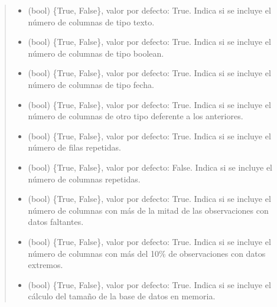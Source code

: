 \documentclass[letterpaper,10pt,openany,spanish]{sphinxmanual}
\begin{document}
\begin{fulllineitems}
\begin{fulllineitems}
\begin{quote}
\begin{description}
\begin{itemize}
\item {} 
 \textendash{} (bool) \{True, False\}, valor por defecto: True.             Indica si se incluye el número de columnas de tipo texto.

\item {} 
 \textendash{} (bool) \{True, False\}, valor por defecto: True.             Indica si se incluye el número de columnas de tipo boolean.

\item {} 
 \textendash{} (bool) \{True, False\}, valor por defecto: True.             Indica si se incluye el número de columnas de tipo fecha.

\item {} 
 \textendash{} (bool) \{True, False\}, valor por defecto: True.             Indica si se incluye el número de columnas de otro tipo deferente             a los anteriores.

\item {} 
 \textendash{} (bool) \{True, False\}, valor por defecto: True.             Indica si se incluye el número de filas repetidas.

\item {} 
 \textendash{} (bool) \{True, False\}, valor por defecto:             False. Indica si se incluye el número de columnas repetidas.

\item {} 
 \textendash{} (bool) \{True, False\}, valor por defecto: True.             Indica si se incluye el número de columnas con más de la mitad de             las observaciones con datos faltantes.

\item {} 
 \textendash{} (bool) \{True, False\}, valor por defecto: True.             Indica si se incluye el número de columnas con más del 10\% de                 observaciones con datos extremos.

\item {} 
 \textendash{} (bool) \{True, False\}, valor por defecto: True.             Indica si se incluye el cálculo del tamaño de la base de datos en memoria.


\end{itemize}
\end{description}
\end{quote}
\end{fulllineitems}
\end{fulllineitems}
\end{document}
